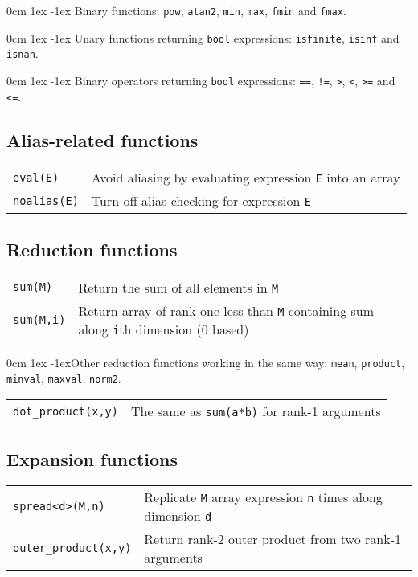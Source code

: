 \documentclass[10pt,a4,landscape]{article}
\def\hangingpar{\parshape 2 0cm \linewidth 1ex \dimexpr\linewidth-1ex\relax}
\def\code#1{\texttt{#1}}
\begin{document}
\hangingpar
Binary functions: \code{pow}, \code{atan2}, \code{min},
  \code{max}, \code{fmin} and \code{fmax}.

\hangingpar
Unary functions returning \code{bool} expressions: \code{isfinite},
\code{isinf} and \code{isnan}.

\hangingpar
Binary operators returning \code{bool} expressions: \code{==},
\code{!=}, \code{>}, \code{<}, \code{>=} and \code{<=}.

\subsection*{Alias-related functions}
\begin{tabular}{ll}
\code{eval(E)} & Avoid aliasing by evaluating expression \code{E} into an array\\
\code{noalias(E)} & Turn off alias checking for expression \code{E}\\
\end{tabular}
\subsection*{Reduction functions}
\begin{tabular}{ll}
\code{sum(M)} & Return the sum of all elements in \code{M}\\
\code{sum(M,i)} & Return array of rank one less than \code{M} containing sum along \code{i}th dimension (0 based)\\
\end{tabular}

\hangingpar Other reduction functions working in the same way:
\code{mean}, \code{product}, \code{minval}, \code{maxval}, \code{norm2}.

\begin{tabular}{ll}
\code{dot\_product(x,y)} & The same as \code{sum(a*b)} for rank-1
arguments\\
\end{tabular}
\subsection*{Expansion functions}
\begin{tabular}{ll}
\code{spread<d>(M,n)} & Replicate \code{M} array expression \code{n}
times along dimension \code{d}\\
\code{outer\_product(x,y)} & Return rank-2 outer product from two
rank-1 arguments\\
\end{tabular}
\end{document}
